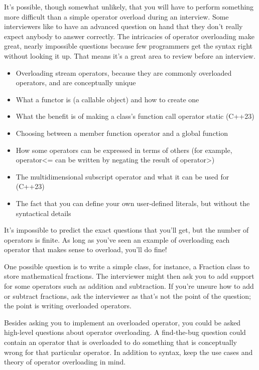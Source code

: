 
It’s possible, though somewhat unlikely, that you will have to perform something more difficult than a simple operator overload during an interview. Some interviewers like to have an advanced question on hand that they don’t really expect anybody to answer correctly. The intricacies of operator overloading make great, nearly impossible questions because few programmers get the syntax right without looking it up. That means it’s a great area to review before an interview.


\begin{itemize}
\item
Overloading stream operators, because they are commonly overloaded operators, and are conceptually unique

\item
What a functor is (a callable object) and how to create one

\item
What the benefit is of making a class’s function call operator static (C++23)

\item
Choosing between a member function operator and a global function

\item
How some operators can be expressed in terms of others (for example, operator<= can be written by negating the result of operator>)

\item
The multidimensional subscript operator and what it can be used for (C++23)

\item
The fact that you can define your own user-defined literals, but without the syntactical details
\end{itemize}


It’s impossible to predict the exact questions that you’ll get, but the number of operators is finite. As long as you’ve seen an example of overloading each operator that makes sense to overload, you’ll do fine!

One possible question is to write a simple class, for instance, a Fraction class to store mathematical fractions. The interviewer might then ask you to add support for some operators such as addition and subtraction. If you’re unsure how to add or subtract fractions, ask the interviewer as that’s not the point of the question; the point is writing overloaded operators.

Besides asking you to implement an overloaded operator, you could be asked high-level questions about operator overloading. A find-the-bug question could contain an operator that is overloaded to do something that is conceptually wrong for that particular operator. In addition to syntax, keep the use cases and theory of operator overloading in mind.